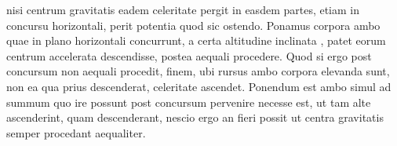 %
nisi %
centrum gravitatis\protect{} eadem
celeritate pergit in easdem partes, etiam in concursu horizontali,%
\protect{} perit %
potentia\protect{}
quod sic ostendo. Ponamus 
corpora ambo
quae in plano horizontali%
\protect{} concurrunt, a
certa altitudine inclinata
%
,
%
patet eorum centrum
%
%
accelerata%
\protect{} descendisse, postea aequali procedere. Quod si ergo post concursum non aequali procedit, 
%
%
finem, ubi rursus ambo corpora elevanda sunt, non ea qua prius descenderat,
celeritate ascendet. Ponendum est ambo simul ad summum quo ire 
%
possunt post
%
concursum pervenire necesse est, ut tam alte ascenderint, quam descenderant, nescio ergo
an fieri possit ut centra gravitatis semper procedant aequaliter.%
\protect{}
%
\pend
\count{}%
\count{}%
\count{}
%
%